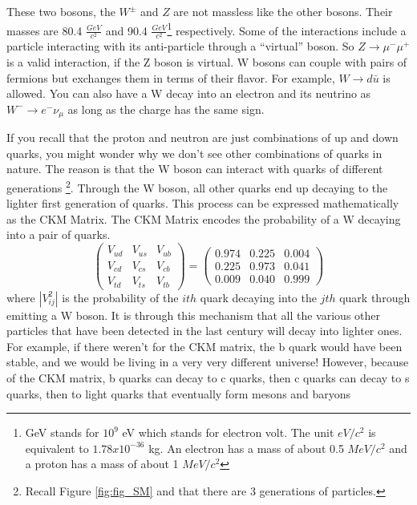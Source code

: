 These two bosons, the $W^{\pm}$ and $Z$ are not massless like the other bosons. Their masses are 80.4 $\frac{GeV}{c^2}$ and 90.4 $\frac{GeV}{c^2}$\footnote{GeV stands for $10^9$ eV which stands for electron volt. The unit $eV/c^2$ is equivalent to $1.78 x 10^{-36}$ kg. An electron has a mass of about 0.5 $MeV/c^2$ and a proton has a mass of about 1 $MeV/c^2$} respectively.
Some of the interactions include a particle interacting with its anti-particle through a ``virtual'' boson. So $ Z \rightarrow \mu^- \mu^+$ is a valid interaction, if the Z boson is virtual. 
W bosons can couple with pairs of fermions but exchanges them in terms of their flavor. For example, $W \rightarrow d \bar{u}$ is allowed.
You can also have a W decay into an electron and its neutrino as $W^- \rightarrow e^- \nu_{\mu}$ as long as the charge has the same sign.

If you recall that the proton and neutron are just combinations of up and down quarks, you might wonder why we don't see other combinations of quarks in nature.
The reason is that the W boson can interact with quarks of different generations \footnote{Recall Figure \ref{fig:fig_SM} and that there are 3 generations of particles.}. 
Through the W boson, all other quarks end up decaying to the lighter first generation of quarks. This process can be expressed mathematically as the CKM Matrix. The CKM Matrix encodes the probability of a W decaying into a pair of quarks. 
\begin{equation}
   \begin{pmatrix}
      V_{ud} & V_{us} & V_{ub}\\
      V_{cd} & V_{cs} & V_{cb}\\
      V_{td} & V_{ts} & V_{tb} 
   \end{pmatrix}
   = 
   \begin{pmatrix}
       0.974 & 0.225 & 0.004 \\
       0.225 & 0.973 & 0.041 \\
       0.009 & 0.040 & 0.999
   \end{pmatrix}
   \label{eq:eq_CKM}
\end{equation}
where $|V_{ij}^2|$ is the probability of the $ith$ quark decaying into the $jth$ quark through emitting a W boson.
It is through this mechanism that all the various other particles that have been detected in the last century will decay into lighter ones.
For example, if there weren't for the CKM matrix, the b quark would have been stable, and we would be living in a very very different universe!  
However, because of the CKM matrix, b quarks can decay to c quarks, then c quarks can decay to s quarks, then to light quarks that eventually form mesons and baryons

